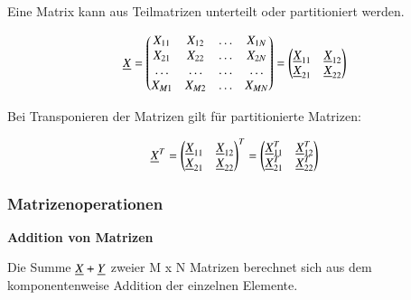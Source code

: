 \noindent Eine Matrix kann aus Teilmatrizen unterteilt oder partitioniert werden. 

\begin{equation}\label{eq:fifteeneight}
\underline{X} =
\begin{pmatrix}
X_{11} & X_{12} & \dots & X_{1N}\\
X_{21} & X_{22} & \dots & X_{2N}\\
\dots & \dots & \dots & \dots\\
X_{M1} & X_{M2} & \dots & X_{MN}\\
\end{pmatrix} =
\begin{pmatrix}
\underline{X}_{11} & \underline{X}_{12}\\
\underline{X}_{21} & \underline{X}_{22}\\
\end{pmatrix} 
\end{equation}

\noindent Bei Transponieren der Matrizen gilt f\"{u}r partitionierte Matrizen:

\begin{equation}\label{eq:fifteennine}
\underline{X}^{T} =
\begin{pmatrix}
\underline{X}_{11} & \underline{X}_{12}\\
\underline{X}_{21} & \underline{X}_{22}\\
\end{pmatrix}^{T} =
\begin{pmatrix}
\underline{X}_{11}^{T} & \underline{X}_{12}^{T}\\
\underline{X}_{21}^{T} & \underline{X}_{22}^{T}\\
\end{pmatrix}
\end{equation}

\clearpage

\subsubsection{Matrizenoperationen}

\selectfont
\noindent\textbf{Addition von Matrizen}\smallskip

\noindent Die Summe $\underline{X} + \underline{Y}$ zweier M x N Matrizen berechnet sich aus dem komponentenweise Addition der einzelnen Elemente.

